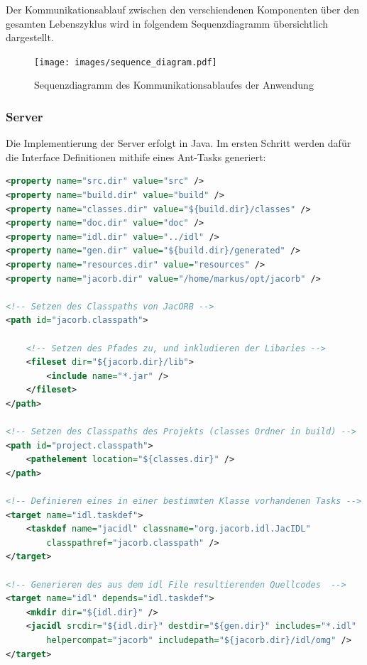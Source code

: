 Der Kommunikationsablauf zwischen den verschiendenen Komponenten \"uber den gesamten Lebenszyklus wird in folgendem Sequenzdiagramm \"ubersichtlich dargestellt.
\begin{figure}[H]
	\begin{center}
		\texttt{[image: images/sequence\_diagram.pdf]}
		\caption{Sequenzdiagramm des Kommunikationsablaufes der Anwendung}
		\label{broker}
	\end{center}
\end{figure}


\subsubsection{Server}
Die Implementierung der Server erfolgt in Java.
Im ersten Schritt werden daf\"ur die Interface Definitionen mithife eines Ant-Tasks generiert:

\begin{lstlisting}[language=XML, caption=Ant Task f\"ur die Generierung der IDL Interfaces]
<property name="src.dir" value="src" />
<property name="build.dir" value="build" />
<property name="classes.dir" value="${build.dir}/classes" />
<property name="doc.dir" value="doc" />
<property name="idl.dir" value="../idl" />
<property name="gen.dir" value="${build.dir}/generated" />
<property name="resources.dir" value="resources" />
<property name="jacorb.dir" value="/home/markus/opt/jacorb" />

<!-- Setzen des Classpaths von JacORB -->
<path id="jacorb.classpath">

	<!-- Setzen des Pfades zu, und inkludieren der Libaries -->
	<fileset dir="${jacorb.dir}/lib">
		<include name="*.jar" />
	</fileset>
</path>

<!-- Setzen des Classpaths des Projekts (classes Ordner in build) -->
<path id="project.classpath">
	<pathelement location="${classes.dir}" />
</path>

<!-- Definieren eines in einer bestimmten Klasse vorhandenen Tasks -->
<target name="idl.taskdef">
	<taskdef name="jacidl" classname="org.jacorb.idl.JacIDL"
		classpathref="jacorb.classpath" />
</target>

<!-- Generieren des aus dem idl File resultierenden Quellcodes  -->
<target name="idl" depends="idl.taskdef">
	<mkdir dir="${idl.dir}" />
	<jacidl srcdir="${idl.dir}" destdir="${gen.dir}" includes="*.idl"
		helpercompat="jacorb" includepath="${jacorb.dir}/idl/omg" />
</target>
\end{lstlisting}

